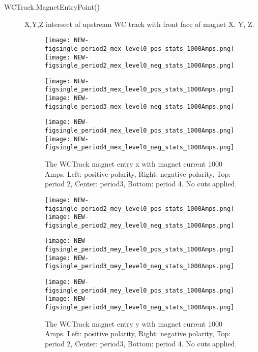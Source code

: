\begin{description}
{}
\item[WCTrack.MagnetEntryPoint()]{
X,Y,Z intersect of upstream WC track with front face of magnet  X, Y, Z.

     \begin{figure}[h]	  
       \centering       
        	\texttt{[image: NEW-figsingle\_period2\_mex\_level0\_pos\_stats\_1000Amps.png]}
	 \texttt{[image: NEW-figsingle\_period2\_mex\_level0\_neg\_stats\_1000Amps.png]}
	 
   	\texttt{[image: NEW-figsingle\_period3\_mex\_level0\_pos\_stats\_1000Amps.png]}
	 \texttt{[image: NEW-figsingle\_period3\_mex\_level0\_neg\_stats\_1000Amps.png]}
	 
 	\texttt{[image: NEW-figsingle\_period4\_mex\_level0\_pos\_stats\_1000Amps.png]}
	 \texttt{[image: NEW-figsingle\_period4\_mex\_level0\_neg\_stats\_1000Amps.png]}
   \caption[short]{The WCTrack magnet entry x with magnet current 1000 Amps. Left: positive polarity, Right: negative polarity, Top: period 2, Center: period3,  Bottom: period 4. No cuts applied.}
   \label{fig_mex}
  \end{figure}
  
       \begin{figure}[h]	
         \centering      
        	\texttt{[image: NEW-figsingle\_period2\_mey\_level0\_pos\_stats\_1000Amps.png]}
	 \texttt{[image: NEW-figsingle\_period2\_mey\_level0\_neg\_stats\_1000Amps.png]}
	 
   	\texttt{[image: NEW-figsingle\_period3\_mey\_level0\_pos\_stats\_1000Amps.png]}
	 \texttt{[image: NEW-figsingle\_period3\_mey\_level0\_neg\_stats\_1000Amps.png]}
	 
 	\texttt{[image: NEW-figsingle\_period4\_mey\_level0\_pos\_stats\_1000Amps.png]}
	 \texttt{[image: NEW-figsingle\_period4\_mey\_level0\_neg\_stats\_1000Amps.png]}
   \caption[short]{The WCTrack magnet entry y with magnet current 1000 Amps. Left: positive polarity, Right: negative polarity, Top: period 2, Center: period3,  Bottom: period 4. No cuts applied.}
   \label{fig_mey}
  \end{figure}
  
}
\end{description}
